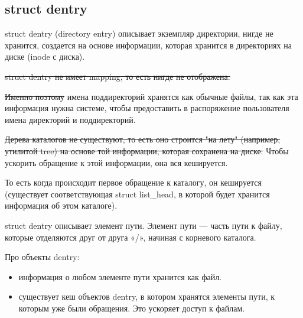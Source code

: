 \subsection{struct dentry}

struct dentry (directory entry) описывает экземпляр директории, нигде не хранится, создается на основе информации, которая хранится в директориях на диске (inode с диска).

\sout{struct dentry не имеет mapping, то есть нигде не отображена.}

\sout{Именно поэтому} имена поддиректорий хранятся как обычные файлы, так как эта информация нужна системе, чтобы предоставить в распоряжение пользователя имена директорий и поддиректорий.

\sout{Дерева каталогов не существуют, то есть оно строится "на лету" (например, утилитой tree) на основе той информации, которая сохранена на диске.} Чтобы ускорить обращение к этой информации, она вся кешируется.

То есть когда происходит первое обращение к каталогу, он кешируется (существует соответствующая struct list\_head, в которой будет хранится информация об этом каталоге).

struct dentry описывает элемент пути. Элемент пути — часть пути к файлу, которые отделяются друг от друга «/», начиная с корневого каталога.

Про объекты dentry:
\begin{itemize}
\item  информация о любом элементе пути хранится как файл.
\item существует кеш объектов dentry, в котором хранятся элементы пути, к которым уже были обращения. Это ускоряет доступ к файлам.
\end{itemize}


